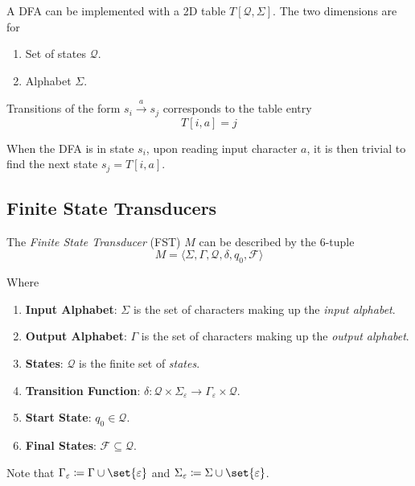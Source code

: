 \begin{definition}
    A DFA can be implemented with a 2D table $T[\mathcal{Q}, \Sigma]$. The two dimensions are for
    \begin{enumerate}
        \item Set of states $\mathcal{Q}$.
        \item Alphabet $\Sigma$.
    \end{enumerate}
    
    Transitions of the form $s_i \xrightarrow{a} s_j$ corresponds to the table entry
    \begin{equation}
        T[i, a] = j
    \end{equation}
    
    When the DFA is in state $s_i$, upon reading input character $a$, it is then trivial to find the next state $s_j = T[i, a]$.
\end{definition}


\subsection{Finite State Transducers}\label{ssec:finite-state-transducers}

\begin{definition}
    The \textit{Finite State Transducer} (FST) $M$ can be described by the 6-tuple
    \begin{equation}
        M = \langle
            \Sigma,
            \Gamma,
            \mathcal{Q},
            \delta,
            q_0,
            \mathcal{F}
        \rangle
    \end{equation}
    
    Where
    \begin{enumerate}
        \item \textbf{Input Alphabet}: $\Sigma$ is the set of characters making up the \textit{input alphabet}.
        \item \textbf{Output Alphabet}: $\Gamma$ is the set of characters making up the \textit{output alphabet}.
        \item \textbf{States}: $\mathcal{Q}$ is the finite set of \textit{states}.
        \item \textbf{Transition Function}: $\delta \colon \mathcal{Q} \times \Sigma_{\varepsilon} \to \Gamma_{\varepsilon} \times \mathcal{Q}$.
        \item \textbf{Start State}: $q_0 \in \mathcal{Q}$.
        \item \textbf{Final States}: $\mathcal{F} \subseteq \mathcal{Q}$.
    \end{enumerate}
    
    Note that $\Gamma_{\varepsilon} \coloneqq \Gamma \cup \set{\varepsilon}$ and $\Sigma_{\varepsilon} \coloneqq \Sigma \cup \set{\varepsilon}$.
\end{definition}

